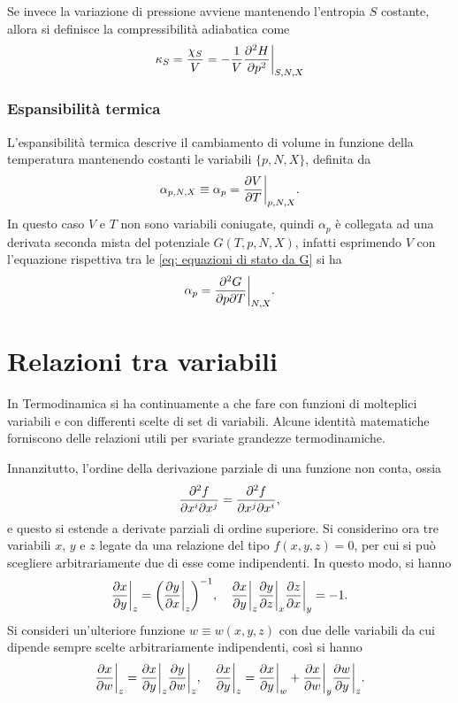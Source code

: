 Se invece la variazione di pressione avviene mantenendo l'entropia $S$ costante, allora si definisce la compressibilità adiabatica come 
\begin{equation}
    \kappa_S = \frac{\chi_S}{V} = -\frac{1}{V}\frac{\partial^2 H}{\partial p^2}\bigg|_{S,N,X}
\end{equation}

\subsubsection{Espansibilità termica}
L'espansibilità termica descrive il cambiamento di volume in funzione della temperatura mantenendo costanti le variabili $\{p,N,X\}$, definita da
\begin{equation}
    \alpha_{p,N,X} \equiv \alpha_p = \frac{\partial V}{\partial T}\bigg|_{p,N,X}.
\end{equation}
In questo caso $V$ e $T$ non sono variabili coniugate, quindi $\alpha_p$ è collegata ad una derivata seconda mista del potenziale $G(T,p,N,X)$, infatti esprimendo $V$ con l'equazione rispettiva tra le \eqref{eq: equazioni di stato da G} si ha
\begin{equation}
    \alpha_p = \frac{\partial^2 G}{\partial p\partial T}\bigg|_{N,X}.
\end{equation}

\section{Relazioni tra variabili}
In Termodinamica si ha continuamente a che fare con funzioni di molteplici variabili e con differenti scelte di set di variabili. Alcune identità matematiche forniscono delle relazioni utili per svariate grandezze termodinamiche.

Innanzitutto, l'ordine della derivazione parziale di una funzione non conta, ossia
\begin{equation}
\label{eq: ordine derivate parziali irrilevante}
    \frac{\partial^2 f}{\partial x^i\partial x^j} = \frac{\partial^2 f}{\partial x^j \partial x^i},
\end{equation}
e questo si estende a derivate parziali di ordine superiore. Si considerino ora tre variabili $x$, $y$ e $z$ legate da una relazione del tipo $f(x,y,z) = 0$, per cui si può scegliere arbitrariamente due di esse come indipendenti. In questo modo, si hanno
\begin{equation}
    \frac{\partial x}{\partial y}\bigg|_z = \bigg(\frac{\partial y}{\partial x}\bigg|_z\bigg)^{-1},\quad\frac{\partial x}{\partial y}\bigg|_z\frac{\partial y}{\partial z}\bigg|_x\frac{\partial z}{\partial x}\bigg|_y = -1.
\end{equation}
Si consideri un'ulteriore funzione $w\equiv w(x,y,z)$ con due delle variabili da cui dipende sempre scelte arbitrariamente indipendenti, così si hanno
\begin{equation}
    \frac{\partial x}{\partial w}\bigg|_z = \frac{\partial x}{\partial y}\bigg|_z\frac{\partial y}{\partial w}\bigg|_z,\quad\frac{\partial x}{\partial y}\bigg|_z = \frac{\partial x}{\partial y}\bigg|_w + \frac{\partial x}{\partial w}\bigg|_y\frac{\partial w}{\partial y}\bigg|_z.
\end{equation}


